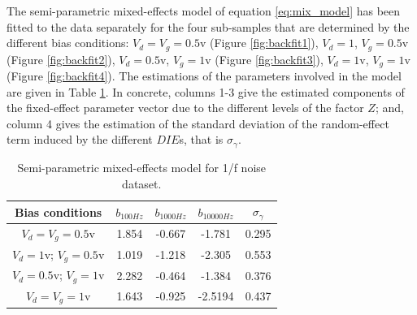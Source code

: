 \documentclass[sn-mathphys]{sn-jnl}%
\theoremstyle{thmstyleone}%
\theoremstyle{thmstyletwo}%
\theoremstyle{thmstylethree}%
\begin{document}
The semi-parametric mixed-effects model of equation \eqref{eq:mix_model} has been fitted to the data separately for the four sub-samples that are determined by the different bias conditions: $V_d=V_g=0.5$v (Figure \ref{fig:backfit1}),  $V_d=1$, $V_g=0.5$v (Figure \ref{fig:backfit2}), $V_d=0.5$v, $V_g=1$v (Figure \ref{fig:backfit3}), $V_d=1$v, $V_g=1$v (Figure \ref{fig:backfit4}). The estimations of the parameters involved in the model are given in Table \ref{tab:estim_noise}. In concrete, columns 1-3 give the estimated components of the fixed-effect parameter vector due to the different levels of the factor $Z$; and, column 4 gives the estimation of the standard deviation of the random-effect term induced by the different $DIE$s, that is $\sigma_{\gamma}$.
\begin{table}[!t]
	\begin{center}
	
		\label{tab:estim_noise}
		\begin{tabular}{|c|c|c|c|c|} \hline
			Bias conditions      &$b_{100Hz}$  &$b_{1000Hz}$  &$b_{10000Hz}$  &$ \sigma_{\gamma}$ \\ \hline
			$V_d=V_g=0.5$v       &1.854        &-0.667        &-1.781 	      &  0.295  \\ \hline
			$V_d=1$v; $V_g=0.5$v &1.019	       &-1.218        &-2.305 	      &  0.553 \\ \hline
			$V_d=0.5$v; $V_g=1$v &2.282        &-0.464        &-1.384	        &  0.376  \\ \hline
			$V_d=V_g=1$v         &1.643	       &-0.925        &-2.5194	      &  0.437  \\ \hline
		\end{tabular}
		\caption{Semi-parametric mixed-effects model for 1/f noise dataset.}
	\end{center}
\end{table}
\end{document}
